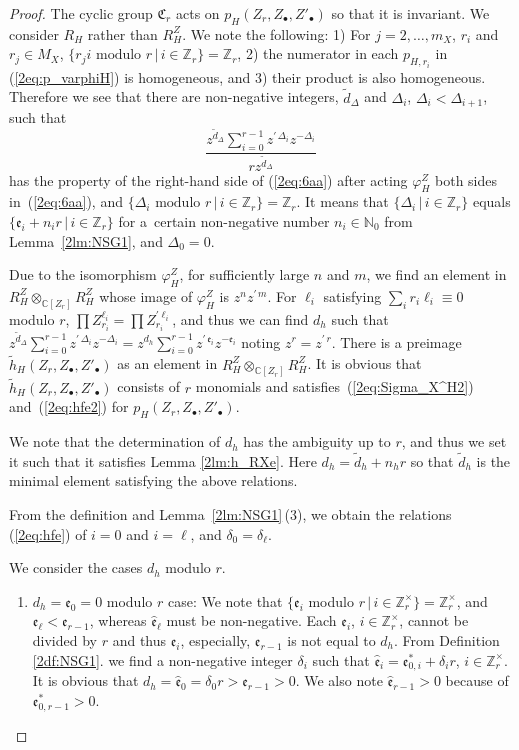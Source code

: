 \documentclass[pdftex]{sigma}
\def\CC{{\mathbb C}}
\def\ZZ{{\mathbb Z}}
\def\NN{{\mathbb N}}
\def\fC{{\mathfrak C}}
\def\fe{{\mathfrak e}}
\def\td{{\widetilde d}}
\def\th{{\widetilde h}}
\def\hfe{{\widehat{\mathfrak e}}}
\numberwithin{equation}{section}
\begin{document}
\begin{proof}The cyclic group $\fC_r$ acts on $p_{H}(Z_r, Z_\bullet, Z'_\bullet)$ so that it is invariant.
We consider $R_H$ rather than $R_H^Z$. We note the following:
1) For $j=2, \dots, m_X$, $r_i$ and $r_j\in M_X$, $\{r_j i \text{ modulo } r\, |\,i\in \ZZ_r\}=\ZZ_r$,
2) the numerator in each $p_{H, r_i}$ in (\ref{2eq:p_varphiH}) is homogeneous, and
3) their product is also homogeneous.
Therefore we see that there are non-negative integers, $\td_\Delta$ and $\Delta_i$, $\Delta_{i}<\Delta_{i+1}$, such that
\[
\frac{z^{\td_\Delta}\sum_{i=0}^{r-1}
z^{\prime\, \Delta_i}z^{-\Delta_i}
}
{r z^{\td_\Delta}}
\]
has the property of the right-hand side of (\ref{2eq:6aa}) after acting $\varphi_H^Z$ both sides in~(\ref{2eq:6aa}), and $\{\Delta_i \text{ modulo } r\, |\,i\in \ZZ_r\}=\ZZ_r$.
It means that $\{\Delta_i \, |\,i\in \ZZ_r\}$ equals $\{\fe_i + n_i r \, |\,i\in \ZZ_r\}$ for a~certain non-negative number $n_i \in \NN_0$ from Lemma~\ref{2lm:NSG1}, and $\Delta_0 = 0$.

Due to the isomorphism $\varphi_H^Z$, for sufficiently large $n$ and $m$, we find an element in $R_H^Z \otimes_{\CC[Z_r]} R_H^Z$ whose image of $\varphi_H^Z$ is $z^{n}z^{\prime\, m}$.
For $\ell_i$ satisfying $\sum_i r_i \ell_i \equiv 0$ modulo $r$, $\prod Z_{r_i}^{\ell_i} = \prod Z_{r_i}^{\prime \ell_i}$, and thus we can find $d_h$ such that
$z^{\td_\Delta}\sum_{i=0}^{r-1} z^{\prime\, \Delta_i}z^{-\Delta_i}
=z^{d_h}\sum_{i=0}^{r-1}z^{\prime\, \fe_i}z^{-\fe_i}$ noting $z^r=z^{\prime\, r}$.
There is a preimage $\th_{H}(Z_r, Z_\bullet, Z'_\bullet)$ as an element in $R_H^Z \otimes_{\CC[Z_r]} R_H^Z$.
It is obvious that $\th_{H}(Z_r, Z_\bullet, Z'_\bullet)$ consists of $r$ monomials and satisfies~(\ref{2eq:Sigma_X^H2}) and~(\ref{2eq:hfe2}) for $p_{H}(Z_r, Z_\bullet, Z'_\bullet)$.

We note that the determination of $d_h$ has the ambiguity up to $r$, and thus we set it such that it satisfies Lemma \ref{2lm:h_RXe}.
Here $d_h = \td_h + n_h r$ so that $\td_h$ is the minimal element satisfying the above relations.

From the definition and Lemma~\ref{2lm:NSG1}\,(3), we obtain the relations (\ref{2eq:hfe}) of $i=0$ and $i=\ell$, and $\delta_0 = \delta_\ell$.

We consider the cases $d_h$ modulo $r$.
\begin{enumerate}\itemsep=0pt
\item $d_h = \fe_0 = 0$ modulo $r$ case:
We note that $\{\fe_i $ modulo $r \, |\,i\in \ZZ_r^\times\}= \ZZ_r^\times$, and $\fe_\ell < \fe_{r-1}$, whereas $\hfe_\ell$ must be non-negative.
Each $\fe_{i}$, $i \in \ZZ_r^\times$, cannot be divided by $r$ and thus $\fe_{i}$, especially, $\fe_{r-1}$ is not equal to $d_h$.
From Definition \ref{2df:NSG1}. we find a non-negative integer $\delta_i$ such that $\hfe_i =\fe_{0,i}^* + \delta_i r$, $i \in \ZZ_r^\times$. It is obvious that $d_h=\hfe_0=\delta_0r >\fe_{r-1}>0$.
We also note $\hfe_{r-1}>0$ because of $\fe_{0,r-1}^*>0$.


\end{enumerate}
\end{proof}
\end{document}

